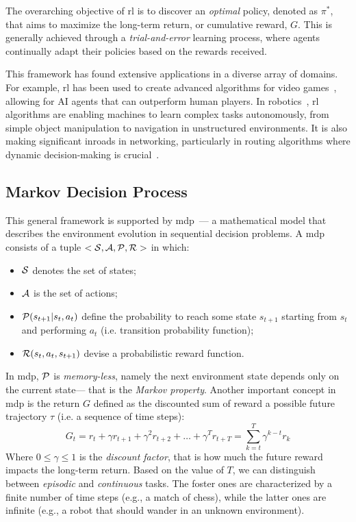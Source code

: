 The overarching objective of \ac{rl} is to discover an \emph{optimal} policy, 
 denoted as $\pi^*$, that aims to maximize the long-term return, or cumulative reward, $G$. 
 This is generally achieved through a \emph{trial-and-error} learning process, 
 where agents continually adapt their policies based on the rewards received.

This framework has found extensive applications in a diverse array of domains. 
 For example, \ac{rl} has been used to create advanced algorithms for video games~\cite{DBLP:journals/spm/ArulkumaranDBB17}, 
 allowing for AI agents that can outperform human players. 
% 
In robotics~\cite{DBLP:journals/ijrr/KoberBP13}, 
 \ac{rl} algorithms are enabling machines to learn complex tasks autonomously, 
 from simple object manipulation to navigation in unstructured environments. 
 It is also making significant inroads in networking, 
 particularly in routing algorithms where dynamic decision-making is crucial~\cite{DBLP:journals/comsur/LuongHGNWLK19}.

\subsection{Markov Decision Process}
This general framework is supported by \ac{mdp}~\cite{howard1960dynamic}---
 a mathematical model that describes the environment evolution in sequential decision problems. 
%
A \ac{mdp} consists of a tuple $<\mathcal{S}, \mathcal{A}, \mathcal{P}, \mathcal{R}>$ in which:
\begin{itemize}
  \item $\mathcal{S}$ denotes the set of states;
  \item $\mathcal{A}$ is the set of actions;
  \item $\mathcal{P}(s_{t + 1} | s_t, a_t)$ define the probability to reach some state $s_{t + 1}$ starting from $s_t$ and performing $a_t$ (i.e. transition probability function);
  \item $\mathcal{R}(s_t, a_t, s_{t+1})$ devise a probabilistic reward function.
\end{itemize}
In \ac{mdp}, $\mathcal{P}$ is \emph{memory-less}, 
 namely the next environment state depends only on the current state---
 that is the \emph{Markov property}.
Another important concept in \ac{mdp} is the return 
 $G$ defined as the discounted sum of reward a possible future trajectory $\tau$ (i.e. a sequence of time steps):
\begin{equation}
G_{t} = r_t + \gamma r_{t + 1} + \gamma^2 r_{t + 2} + \dots + \gamma^T r_{t + T} = \sum_{k = t}^T \gamma^{k-t} r_k
\end{equation}
Where $0 \leq \gamma \leq 1$ is the \emph{discount factor}, 
 that is how much the future reward impacts the long-term return.
Based on the value of $T$, 
 we can distinguish between \emph{episodic} and \emph{continuous} tasks.
 The foster ones are characterized by a finite number of time steps (e.g., a match of chess), 
 while the latter ones are infinite (e.g., a robot that should wander in an unknown environment).
